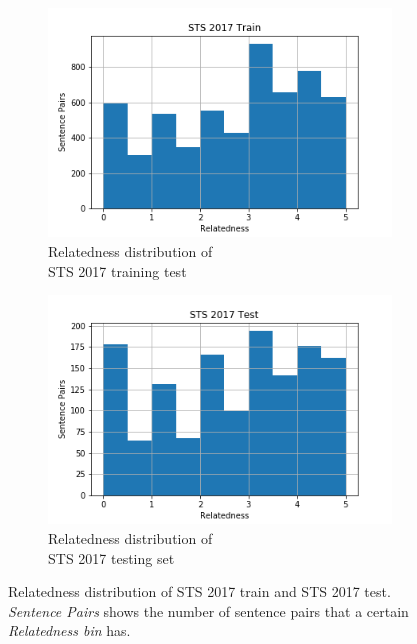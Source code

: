 \begin{enumerate}
\begin{figure}
	\captionsetup[subfigure]{justification=centering}
	\centering
	\begin{subfigure}[b]{.5\textwidth}
		\centering
		\includegraphics[width=\textwidth]{figures/semantic_textual_similarity/introduction/sts_train.png}
		\caption{Relatedness distribution of \\ STS 2017 training test}
		\label{fig:sts_train_relatedness}
	\end{subfigure}%
	\begin{subfigure}[b]{.5\textwidth}
		\centering
		\includegraphics[width=\textwidth]{figures/semantic_textual_similarity/introduction/sts_test.png}
		\caption{Relatedness distribution of \\ STS 2017 testing set}
		\label{fig:sts_test_relatedness}
	\end{subfigure}
	\caption[Relatedness distribution of STS 2017 train and STS 2017 test]{Relatedness distribution of STS 2017 train and STS 2017 test. \textit{Sentence Pairs} shows the number of sentence pairs that a certain \textit{Relatedness bin} has.}
	\label{fig:sts_relatedness}
\end{figure}



\end{enumerate}
